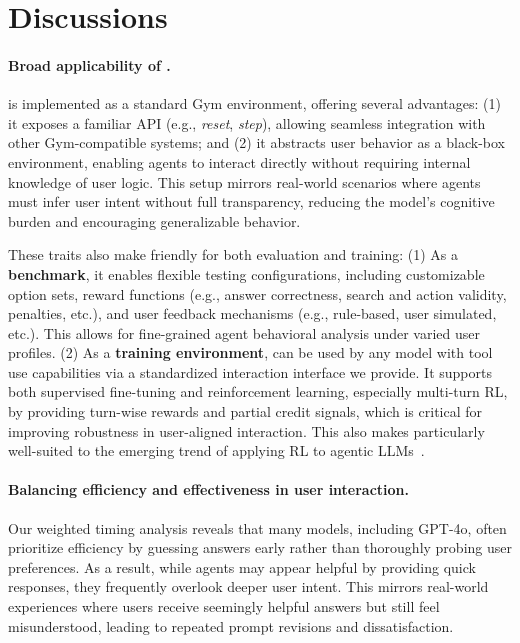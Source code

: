 \section{Discussions}
\paragraph{Broad applicability of {\gymname}.}  
{\gymname} is implemented as a standard Gym environment, offering several advantages: (1) it exposes a familiar API (e.g., \textit{reset}, \textit{step}), allowing seamless integration with other Gym-compatible systems; and (2) it abstracts user behavior as a black-box environment, enabling agents to interact directly without requiring internal knowledge of user logic. This setup mirrors real-world scenarios where agents must infer user intent without full transparency, reducing the model's cognitive burden and encouraging generalizable behavior.

These traits also make {\gymname} friendly for both evaluation and training:  
(1) As a \textbf{benchmark}, it enables flexible testing configurations, including customizable option sets, reward functions (e.g., answer correctness, search and action validity, penalties, etc.), and user feedback mechanisms (e.g., rule-based, user simulated, etc.). This allows for fine-grained agent behavioral analysis under varied user profiles.  
(2) As a \textbf{training environment}, {\gymname} can be used by any model with tool use capabilities via a standardized interaction interface we provide. It supports both supervised fine-tuning and reinforcement learning, especially multi-turn RL, by providing turn-wise rewards and partial credit signals, which is critical for improving robustness in user-aligned interaction. This also makes {\gymname} particularly well-suited to the emerging trend of applying RL to agentic LLMs~\citep{jin2025search, li2025torl, qian2025toolrl}.

\paragraph{Balancing efficiency and effectiveness in user interaction.}
Our weighted timing analysis reveals that many models, including GPT-4o, often prioritize efficiency by guessing answers early rather than thoroughly probing user preferences. As a result, while agents may appear helpful by providing quick responses, they frequently overlook deeper user intent. This mirrors real-world experiences where users receive seemingly helpful answers but still feel misunderstood, leading to repeated prompt revisions and dissatisfaction.

